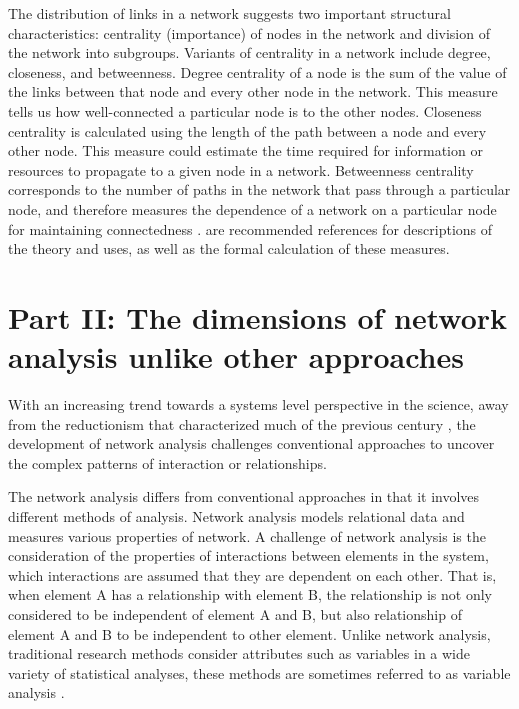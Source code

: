 The distribution of links in a network suggests two important structural characteristics: centrality (importance) of nodes in the network and division of the network into subgroups. Variants of centrality in a network include degree, closeness, and betweenness. Degree centrality of a node is the sum of the value of the links between that node and every other node in the network. This measure tells us how well-connected a particular node is to the other nodes. Closeness centrality is calculated using the length of the path between a node and every other node. This measure could estimate the time required for information or resources to propagate to a given node in a network. Betweenness centrality corresponds to the number of paths in the network that pass through a particular node, and therefore measures the dependence of a network on a particular node for maintaining connectedness .  are recommended references for descriptions of the theory and uses, as well as the formal calculation of these measures.


\section*{Part II: The dimensions of network analysis unlike other approaches}
\label{parttwo}


With an increasing trend towards a systems level perspective in the science, away from the reductionism that characterized much of the previous century , the development of network analysis challenges conventional approaches to uncover the complex patterns of interaction or relationships. 

The network analysis differs from conventional approaches in that it involves different methods of analysis. 
Network analysis models relational data and measures various properties of network. A challenge of network analysis is the consideration of the properties of interactions between elements in the system, which interactions are assumed that they are dependent on each other. That is, when element A has a relationship with element B, the relationship is not only considered to be independent of element A and B, but also relationship of element A and B to be independent to other element. Unlike network analysis, traditional research methods consider attributes such as variables in a wide variety of statistical analyses, these methods are sometimes referred to as variable analysis \cite{scott2012social}.

